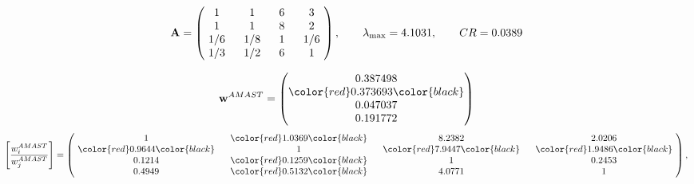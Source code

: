 \begin{example}
\begin{equation*}
\mathbf{A} =
\begin{pmatrix}
$\,\,$ 1 $\,\,$ & $\,\,$1$\,\,$ & $\,\,$6$\,\,$ & $\,\,$3 $\,\,$ \\
$\,\,$ 1 $\,\,$ & $\,\,$ 1 $\,\,$ & $\,\,$8$\,\,$ & $\,\,$2 $\,\,$ \\
$\,\,$ 1/6$\,\,$ & $\,\,$ 1/8$\,\,$ & $\,\,$ 1 $\,\,$ & $\,\,$ 1/6 $\,\,$ \\
$\,\,$ 1/3$\,\,$ & $\,\,$ 1/2$\,\,$ & $\,\,$6$\,\,$ & $\,\,$ 1  $\,\,$ \\
\end{pmatrix},
\qquad
\lambda_{\max} =
4.1031,
\qquad
CR = 0.0389
\end{equation*}

\begin{equation*}
\mathbf{w}^{AMAST} =
\begin{pmatrix}
0.387498\\
\color{red} 0.373693\color{black} \\
0.047037\\
0.191772
\end{pmatrix}\end{equation*}
\begin{equation*}
\left[ \frac{{w}^{AMAST}_i}{{w}^{AMAST}_j} \right] =
\begin{pmatrix}
$\,\,$ 1 $\,\,$ & $\,\,$\color{red} 1.0369\color{black} $\,\,$ & $\,\,$8.2382$\,\,$ & $\,\,$2.0206$\,\,$ \\
$\,\,$\color{red} 0.9644\color{black} $\,\,$ & $\,\,$ 1 $\,\,$ & $\,\,$\color{red} 7.9447\color{black} $\,\,$ & $\,\,$\color{red} 1.9486\color{black}   $\,\,$ \\
$\,\,$0.1214$\,\,$ & $\,\,$\color{red} 0.1259\color{black} $\,\,$ & $\,\,$ 1 $\,\,$ & $\,\,$0.2453 $\,\,$ \\
$\,\,$0.4949$\,\,$ & $\,\,$\color{red} 0.5132\color{black} $\,\,$ & $\,\,$4.0771$\,\,$ & $\,\,$ 1  $\,\,$ \\
\end{pmatrix},
\end{equation*}


\end{example}

